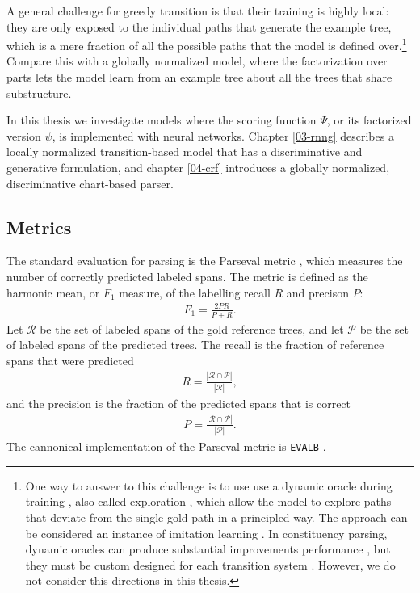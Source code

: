     A general challenge for greedy transition is that their training is highly local: they are only exposed to the individual paths that generate the example tree, which is a mere fraction of all the possible paths that the model is defined over.\footnote{One way to answer to this challenge is to use use a dynamic oracle during training \citep{goldberg2013dynamic}, also called exploration \citep{ballesteros2016exploration,stern2017minimal}, which allow the model to explore paths that deviate from the single gold path in a principled way. The approach can be considered an instance of imitation learning \citep{vlachos2012imitation,he2012imitation}. In constituency parsing, dynamic oracles can produce substantial improvements performance \citep{ballesteros2016exploration}, but they must be custom designed for each transition system \citep{klein2018reinforce}. However, we do not consider this directions in this thesis.} Compare this with a globally normalized model, where the factorization over parts lets the model learn from an example tree about all the trees that share substructure.

    In this thesis we investigate models where the scoring function $\Psi$, or its factorized version $\psi$, is implemented with neural networks. Chapter \ref{03-rnng} describes a locally normalized transition-based model that has a discriminative and generative formulation, and chapter \ref{04-crf} introduces a globally normalized, discriminative chart-based parser.


  \subsection{Metrics}
    The standard evaluation for parsing is the Parseval metric \citep{black1991parseval}, which measures the number of correctly predicted labeled spans. The metric is defined as the harmonic mean, or $F_1$ measure, of the labelling recall $R$ and precison $P$:
    \begin{align}
      \label{eq:fscore}
      F_1 = \frac{2 PR}{P + R}.
    \end{align}
    Let $\mathcal{R}$ be the set of labeled spans of the gold reference trees, and let $\mathcal{P}$ be the set of labeled spans of the predicted trees. The recall is the fraction of reference spans that were predicted
    \begin{align*}
      R = \frac{|\mathcal{R} \cap \mathcal{P}|}{|\mathcal{R}|},
    \end{align*}
    and the precision is the fraction of the predicted spans that is correct
    \begin{align*}
      P = \frac{|\mathcal{R} \cap \mathcal{P}|}{|\mathcal{P}|}.
    \end{align*}
    The cannonical implementation of the Parseval metric is \verb!EVALB! \citep{sekine1997evalb}.


